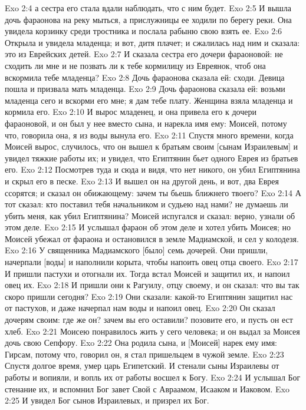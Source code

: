 Exo 2:4  а сестра его стала вдали наблюдать, что с ним будет.
Exo 2:5  И вышла дочь фараонова на реку мыться, а прислужницы ее ходили по берегу реки. Она увидела корзинку среди тростника и послала рабыню свою взять ее.
Exo 2:6  Открыла и увидела младенца; и вот, дитя плачет; и сжалилась над ним и сказала: это из Еврейских детей.
Exo 2:7  И сказала сестра его дочери фараоновой: не сходить ли мне и не позвать ли к тебе кормилицу из Евреянок, чтоб она вскормила тебе младенца?
Exo 2:8  Дочь фараонова сказала ей: сходи. Девица пошла и призвала мать младенца.
Exo 2:9  Дочь фараонова сказала ей: возьми младенца сего и вскорми его мне; я дам тебе плату. Женщина взяла младенца и кормила его.
Exo 2:10  И вырос младенец, и она привела его к дочери фараоновой, и он был у нее вместо сына, и нарекла имя ему: Моисей, потому что, говорила она, я из воды вынула его.
Exo 2:11  Спустя много времени, когда Моисей вырос, случилось, что он вышел к братьям своим [сынам Израилевым] и увидел тяжкие работы их; и увидел, что Египтянин бьет одного Еврея из братьев его.
Exo 2:12  Посмотрев туда и сюда и видя, что нет никого, он убил Египтянина и скрыл его в песке.
Exo 2:13  И вышел он на другой день, и вот, два Еврея ссорятся; и сказал он обижающему: зачем ты бьешь ближнего твоего?
Exo 2:14  А тот сказал: кто поставил тебя начальником и судьею над нами? не думаешь ли убить меня, как убил Египтянина? Моисей испугался и сказал: верно, узнали об этом деле.
Exo 2:15  И услышал фараон об этом деле и хотел убить Моисея; но Моисей убежал от фараона и остановился в земле Мадиамской, и сел у колодезя.
Exo 2:16  У священника Мадиамского [было] семь дочерей. Они пришли, начерпали [воды] и наполнили корыта, чтобы напоить овец отца своего.
Exo 2:17  И пришли пастухи и отогнали их. Тогда встал Моисей и защитил их, и напоил овец их.
Exo 2:18  И пришли они к Рагуилу, отцу своему, и он сказал: что вы так скоро пришли сегодня?
Exo 2:19  Они сказали: какой-то Египтянин защитил нас от пастухов, и даже начерпал нам воды и напоил овец.
Exo 2:20  Он сказал дочерям своим: где же он? зачем вы его оставили? позовите его, и пусть он ест хлеб.
Exo 2:21  Моисею понравилось жить у сего человека; и он выдал за Моисея дочь свою Сепфору.
Exo 2:22  Она родила сына, и [Моисей] нарек ему имя: Гирсам, потому что, говорил он, я стал пришельцем в чужой земле.
Exo 2:23  Спустя долгое время, умер царь Египетский. И стенали сыны Израилевы от работы и вопияли, и вопль их от работы восшел к Богу.
Exo 2:24  И услышал Бог стенание их, и вспомнил Бог завет Свой с Авраамом, Исааком и Иаковом.
Exo 2:25  И увидел Бог сынов Израилевых, и призрел их Бог.
